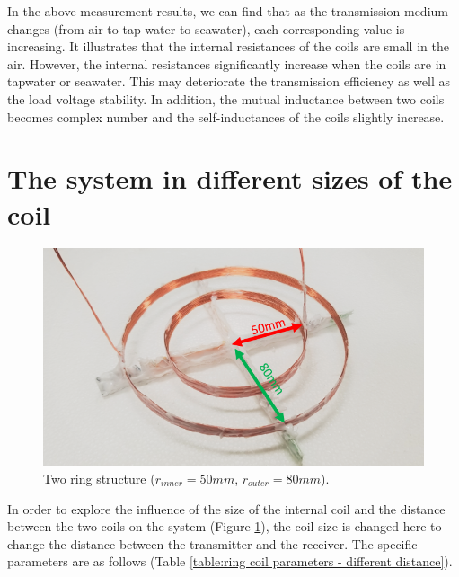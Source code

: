 In the above measurement results, we can find that as the transmission medium changes (from air to tap-water to seawater), each corresponding value is increasing.
It illustrates that the internal resistances of the coils are small in the air.
However, the internal resistances significantly increase when the coils are in tapwater or seawater.
This may deteriorate the transmission efficiency as well as the load voltage stability.
In addition, the mutual inductance between two coils becomes complex number and the self-inductances of the coils slightly increase. 

\section{The system in different sizes of the coil}

\begin{figure}[!t]
    \centering
    \includegraphics[width=0.9\linewidth]{images/3_two_ring_coil_5cm_8cm.png}
    \caption{Two ring structure ($r_{inner}=50mm$, $r_{outer}=80mm$).}
    \label{fig:3_two_ring_coil_5cm_8cm}
\end{figure}

In order to explore the influence of the size of the internal coil and the distance between the two coils on the system (Figure \ref{fig:3_two_ring_coil_5cm_8cm}), the coil size is changed here to change the distance between the transmitter and the receiver. The specific parameters are as follows (Table \ref{table:ring coil parameters - different distance}).

